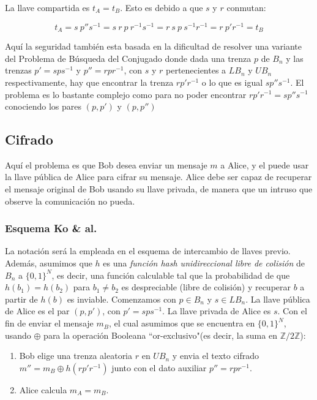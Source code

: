 \documentclass[12pt]{article}
\theoremstyle{definition}
\begin{document}
La llave compartida es $t_A = t_B$. Esto es debido a que $s$ y $r$ conmutan:

$$t_A=s\ p''s^{-1}=s\ r\ p\ r^{-1}s^{-1} = r\ s\ p\ s^{-1}r^{-1} = r\ p'r^{-1}=t_B$$

Aquí la seguridad también esta basada en la dificultad de resolver una variante del Problema de Búsqueda del Conjugado donde dada una trenza $p$ de $B_n$ y las trenzas $p'=sps^{-1}$ y $p''=rpr^{-1}$, con $s$ y $r$ pertenecientes a $LB_n$ y $UB_n$ respectivamente, hay que encontrar la trenza $rp'r^{-1}$ o lo que es igual $sp''s^{-1}$. El problema es lo bastante complejo como para no poder encontrar $rp'r^{-1}=sp''s^{-1}$ conociendo los pares $(p,p')$ y $(p,p'')$

\subsection{Cifrado}
Aquí el problema es que Bob desea enviar un mensaje $m$ a Alice, y el puede usar la llave pública de Alice para cifrar su mensaje. Alice debe ser capaz de recuperar el mensaje original de Bob usando su llave privada, de manera que un intruso que observe la comunicación no pueda.

\subsubsection{Esquema Ko \& al.}
La notación será la empleada en el esquema de intercambio de llaves previo. Además, asumimos que $h$ es una \textit{función hash unidireccional libre de colisión} de $B_n$ a $\{0,1\}^N$, es decir, una función calculable tal que la probabilidad de que $h(b_1)=h(b_2)$ para $b_1\neq b_2$ es despreciable (libre de colisión) y recuperar $b$ a partir de $h(b)$ es inviable.
\newline
\newline
Comenzamos con $p\in B_n$ y $s\in LB_n$. La llave pública de Alice es el par $(p,p')$, con $p'=sps^{-1}$. La llave privada de Alice es $s$. Con el fin de enviar el mensaje $m_B$, el cual asumimos que se encuentra en $\{0,1\}^N$, usando $\oplus$ para la operación Booleana ``or-exclusivo"(es decir, la suma en $\mathbb{Z}/2\mathbb{Z}$):

\begin{enumerate}
\item Bob elige una trenza aleatoria $r$ en $UB_n$ y envia el texto cifrado $m''=m_B\oplus h(rp'r^{-1})$ junto con el dato auxiliar $p''=rpr^{-1}$.
\item Alice calcula $m_A = m_B$. 

\end{enumerate}
\end{document}
